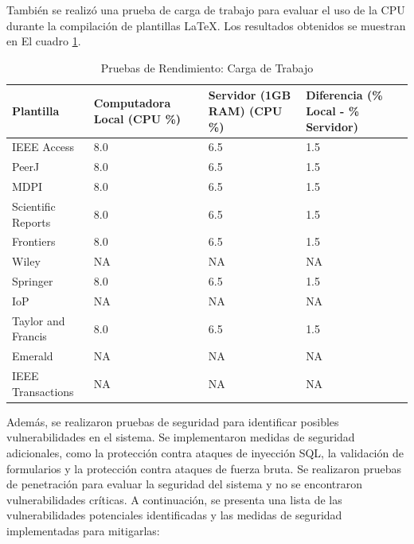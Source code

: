 También se realizó una prueba de carga de trabajo para evaluar el uso de la CPU durante la compilación de plantillas LaTeX. Los resultados obtenidos se muestran en El cuadro \ref{tab:pruebas-rendimiento}.

\begin{table}[H]
    \centering
    \begin{tabular}{|p{5cm}|p{3cm}|p{3cm}|p{3cm}|}
        \hline
        \textbf{Plantilla} & \textbf{Computadora Local (CPU \%)} & \textbf{Servidor (1GB RAM) (CPU \%)} & \textbf{Diferencia (\% Local - \% Servidor)} \\
        \hline
        IEEE Access & 8.0 & 6.5 & 1.5 \\
        PeerJ & 8.0 & 6.5 & 1.5 \\
        MDPI & 8.0 & 6.5 & 1.5 \\
        Scientific Reports & 8.0 & 6.5 & 1.5 \\
        Frontiers & 8.0 & 6.5 & 1.5 \\
        Wiley & NA & NA & NA \\
        Springer & 8.0 & 6.5 & 1.5 \\
        IoP & NA & NA & NA \\
        Taylor and Francis & 8.0 & 6.5 & 1.5 \\
        Emerald & NA & NA & NA \\
        IEEE Transactions & NA & NA & NA \\
        \hline
    \end{tabular}
    \caption{Pruebas de Rendimiento: Carga de Trabajo}
    \label{tab:pruebas-rendimiento}
\end{table}

Además, se realizaron pruebas de seguridad para identificar posibles vulnerabilidades en el sistema. Se implementaron medidas de seguridad adicionales, como la protección contra ataques de inyección SQL, la validación de formularios y la protección contra ataques de fuerza bruta. Se realizaron pruebas de penetración para evaluar la seguridad del sistema y no se encontraron vulnerabilidades críticas. A continuación, se presenta una lista de las vulnerabilidades potenciales identificadas y las medidas de seguridad implementadas para mitigarlas:

